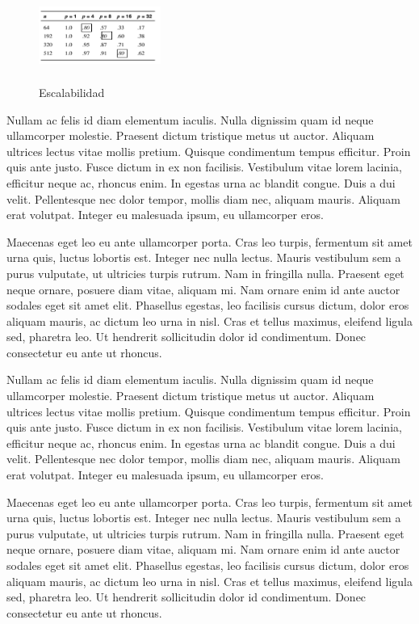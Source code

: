 \documentclass[10pt,twocolumn,a4paper]{article}
\begin{document}
\begin{figure}[H]
\begin{center}
\includegraphics[height=3cm, width=4cm]{grafico3}
\caption{Escalabilidad}
\end{center}
\end{figure}
Nullam ac felis id diam elementum iaculis. Nulla dignissim quam id neque ullamcorper molestie. Praesent dictum tristique metus ut auctor. Aliquam ultrices lectus vitae mollis pretium. Quisque condimentum tempus efficitur. Proin quis ante justo. Fusce dictum in ex non facilisis. Vestibulum vitae lorem lacinia, efficitur neque ac, rhoncus enim. In egestas urna ac blandit congue. Duis a dui velit. Pellentesque nec dolor tempor, mollis diam nec, aliquam mauris. Aliquam erat volutpat. Integer eu malesuada ipsum, eu ullamcorper eros.

Maecenas eget leo eu ante ullamcorper porta. Cras leo turpis, fermentum sit amet urna quis, luctus lobortis est. Integer nec nulla lectus. Mauris vestibulum sem a purus vulputate, ut ultricies turpis rutrum. Nam in fringilla nulla. Praesent eget neque ornare, posuere diam vitae, aliquam mi. Nam ornare enim id ante auctor sodales eget sit amet elit. Phasellus egestas, leo facilisis cursus dictum, dolor eros aliquam mauris, ac dictum leo urna in nisl. Cras et tellus maximus, eleifend ligula sed, pharetra leo. Ut hendrerit sollicitudin dolor id condimentum. Donec consectetur eu ante ut rhoncus.

Nullam ac felis id diam elementum iaculis. Nulla dignissim quam id neque ullamcorper molestie. Praesent dictum tristique metus ut auctor. Aliquam ultrices lectus vitae mollis pretium. Quisque condimentum tempus efficitur. Proin quis ante justo. Fusce dictum in ex non facilisis. Vestibulum vitae lorem lacinia, efficitur neque ac, rhoncus enim. In egestas urna ac blandit congue. Duis a dui velit. Pellentesque nec dolor tempor, mollis diam nec, aliquam mauris. Aliquam erat volutpat. Integer eu malesuada ipsum, eu ullamcorper eros.

Maecenas eget leo eu ante ullamcorper porta. Cras leo turpis, fermentum sit amet urna quis, luctus lobortis est. Integer nec nulla lectus. Mauris vestibulum sem a purus vulputate, ut ultricies turpis rutrum. Nam in fringilla nulla. Praesent eget neque ornare, posuere diam vitae, aliquam mi. Nam ornare enim id ante auctor sodales eget sit amet elit. Phasellus egestas, leo facilisis cursus dictum, dolor eros aliquam mauris, ac dictum leo urna in nisl. Cras et tellus maximus, eleifend ligula sed, pharetra leo. Ut hendrerit sollicitudin dolor id condimentum. Donec consectetur eu ante ut rhoncus.
\end{document}
